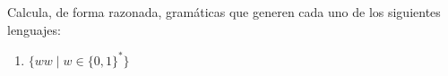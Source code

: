 \begin{ejercicio}
    Calcula, de forma razonada, gramáticas que generen cada uno de los siguientes lenguajes:
    \begin{enumerate}
        \item $\{ww \mid w \in \{0,1\}^\ast\}$





\end{enumerate}
\end{ejercicio}

